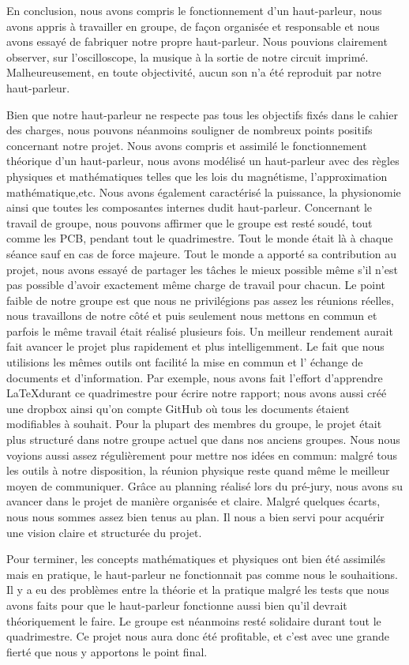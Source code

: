 


En conclusion, nous avons compris le fonctionnement d’un haut-parleur, 
nous avons appris à travailler en groupe, de façon organisée et responsable
et nous avons essayé de fabriquer notre propre haut-parleur. Nous pouvions clairement observer, sur l'oscilloscope,
la musique à la sortie de notre circuit imprimé. Malheureusement, en toute objectivité, aucun son n'a été reproduit par 
notre haut-parleur.

Bien que notre haut-parleur ne respecte pas tous les objectifs fixés dans le cahier des charges, nous pouvons
néanmoins souligner de nombreux points positifs concernant notre projet.
Nous avons compris et assimilé le fonctionnement théorique d’un haut-parleur, 
nous avons modélisé un haut-parleur avec des règles physiques et mathématiques 
telles que les lois du magnétisme, l'approximation mathématique,etc. Nous avons également
caractérisé la puissance, la physionomie ainsi que toutes les composantes internes dudit haut-parleur. 
Concernant le travail de groupe, nous pouvons affirmer que le groupe est resté soudé, tout comme les PCB,
pendant tout le quadrimestre.  Tout le monde était là à chaque séance sauf en cas
de force majeure.  Tout le monde a apporté sa contribution au projet, nous avons essayé de
partager les tâches le mieux possible même s’il n’est pas possible d’avoir 
exactement même charge de travail pour chacun.  Le point faible de notre groupe est 
que nous ne privilégions pas assez les réunions réelles, nous travaillons de notre 
côté et puis seulement nous mettons en commun et parfois le même travail était 
réalisé plusieurs fois.  Un meilleur rendement aurait fait avancer le projet plus 
rapidement et plus intelligemment. 
Le fait que nous utilisions les mêmes outils ont facilité la mise en commun et l’
échange de documents et d’information. Par exemple, nous avons fait l’effort d’apprendre 
\LaTeX durant ce quadrimestre pour écrire notre rapport; nous avons aussi
créé une dropbox ainsi qu’on compte GitHub où tous les documents étaient modifiables à 
souhait. Pour la plupart des membres du groupe, le projet était 
plus structuré dans notre groupe actuel que dans nos anciens groupes. Nous nous voyions aussi 
assez régulièrement pour mettre nos idées en commun: malgré tous les outils à notre 
disposition, la réunion physique reste quand même le meilleur moyen de communiquer.
Grâce au planning réalisé lors du pré-jury, nous avons su avancer dans le projet de manière
organisée et claire.  Malgré quelques écarts, nous nous sommes assez bien tenus au plan.
Il nous a bien servi pour acquérir une vision claire et structurée du projet. 

Pour terminer, les concepts mathématiques et physiques ont bien été assimilés mais en 
pratique, le haut-parleur ne fonctionnait pas comme nous le souhaitions.  Il y a eu des
problèmes entre la théorie et la pratique malgré les tests que nous avons faits pour que 
le haut-parleur fonctionne aussi bien qu’il devrait théoriquement le faire.  Le groupe 
est néanmoins resté solidaire durant tout le quadrimestre. Ce projet nous aura donc été
profitable, et c'est avec une grande fierté que nous y apportons le point final.


